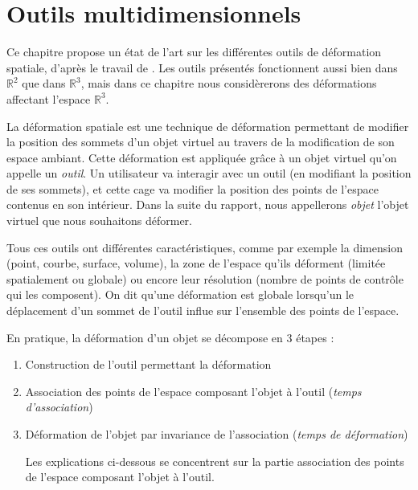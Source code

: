 

\chapter{Outils multidimensionnels}

\graphicspath{{Chapter1/Chapter1Figs/PNG/}{Chapter1/Chapter1Figs/PDF/}{Chapter1/Chapter1Figs/}}

Ce chapitre propose un état de l'art sur les différentes outils de déformation
spatiale, d'après le travail de \cite{GB08}. Les outils présentés fonctionnent
aussi bien dans $\mathbb{R}^2$ que dans $\mathbb{R}^3$, mais dans ce chapitre
nous considèrerons des déformations affectant l'espace $\mathbb{R}^3$.

La déformation spatiale est une technique de déformation permettant de
modifier la position des sommets d'un objet virtuel au travers de la
modification de son espace ambiant. Cette déformation est appliquée grâce à un
objet virtuel qu'on appelle un \textit{outil}. Un utilisateur va interagir
avec un outil (en modifiant la position de ses sommets), et cette cage va
modifier la position des points de l'espace contenus en son intérieur. Dans la
suite du rapport, nous appellerons \textit{objet} l'objet virtuel que nous
souhaitons déformer.

Tous ces outils ont différentes caractéristiques, comme par exemple la
dimension (point, courbe, surface, volume), la zone de l'espace qu'ils
déforment (limitée spatialement ou globale) ou encore leur résolution (nombre
de points de contrôle qui les composent). On dit qu'une déformation est
globale lorsqu'un le déplacement d'un sommet de l'outil influe sur l'ensemble
des points de l'espace.

En pratique, la déformation d'un objet se décompose en 3 étapes :
\begin{enumerate}

\item Construction de l'outil permettant la déformation

\item Association des points de l'espace composant l'objet à l'outil
(\textit{temps d'association})

\item Déformation de l'objet par invariance de l'association (\textit{temps de
déformation})

Les explications ci-dessous se concentrent sur la partie association des
points de l'espace composant l'objet à l'outil.

\end{enumerate} 

